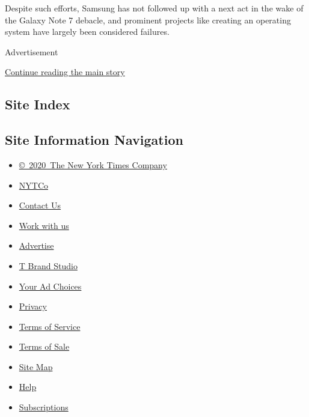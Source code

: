 Despite such efforts, Samsung has not followed up with a next act in the
wake of the Galaxy Note 7 debacle, and prominent projects like creating
an operating system have largely been considered failures.

Advertisement

\protect\hyperlink{after-bottom}{Continue reading the main story}

\hypertarget{site-index}{%
\subsection{Site Index}\label{site-index}}

\hypertarget{site-information-navigation}{%
\subsection{Site Information
Navigation}\label{site-information-navigation}}

\begin{itemize}
\tightlist
\item
  \href{https://help.nytimes.com/hc/en-us/articles/115014792127-Copyright-notice}{©~2020~The
  New York Times Company}
\end{itemize}

\begin{itemize}
\tightlist
\item
  \href{https://www.nytco.com/}{NYTCo}
\item
  \href{https://help.nytimes.com/hc/en-us/articles/115015385887-Contact-Us}{Contact
  Us}
\item
  \href{https://www.nytco.com/careers/}{Work with us}
\item
  \href{https://nytmediakit.com/}{Advertise}
\item
  \href{http://www.tbrandstudio.com/}{T Brand Studio}
\item
  \href{https://www.nytimes.com/privacy/cookie-policy\#how-do-i-manage-trackers}{Your
  Ad Choices}
\item
  \href{https://www.nytimes.com/privacy}{Privacy}
\item
  \href{https://help.nytimes.com/hc/en-us/articles/115014893428-Terms-of-service}{Terms
  of Service}
\item
  \href{https://help.nytimes.com/hc/en-us/articles/115014893968-Terms-of-sale}{Terms
  of Sale}
\item
  \href{https://spiderbites.nytimes.com}{Site Map}
\item
  \href{https://help.nytimes.com/hc/en-us}{Help}
\item
  \href{https://www.nytimes.com/subscription?campaignId=37WXW}{Subscriptions}
\end{itemize}
